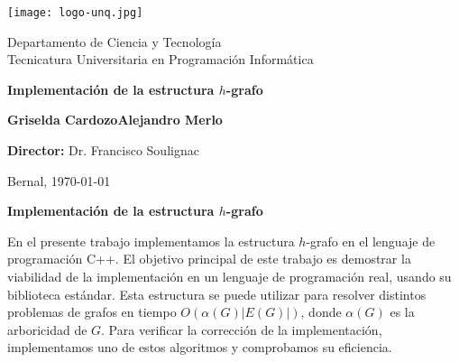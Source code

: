 \documentclass[%
    a4paper,%
    fontsize=12pt,%
    DIV=12,
    twoside,%
    openright,%
    titlepage=true,%
    headsepline,%
    toc=bibliography,%
    parskip=half,%
    cleardoublepage=empty,%
    headings=big,%
]{scrbook}
\DeclareRobustCommand{\CPP}{C\nolinebreak[4]\hspace{-.05em}\raisebox{.4ex}{\relsize{-3}\textbf{++}}\xspace}
\def\CPP{C++}%
\begin{document}

\frontmatter
\begin{titlepage}


\begin{center}
\texttt{[image: logo-unq.jpg]}\\

\medskip

Departamento de Ciencia y Tecnología\\
Tecnicatura Universitaria en Programación Informática\\

\vspace{3cm}

\textbf{\huge Implementación de la estructura $h$-grafo}\\[0.4cm] 

\vspace{1.5cm}

{\large \bfseries {}Griselda CardozoAlejandro Merlo}

\end{center}

\vspace{3cm}

\textbf{Director:} Dr. Francisco Soulignac

\vspace{5mm}

Bernal, \today
{}
\end{titlepage}


\newpage


\cleardoublepage

\vspace*{2cm}

\begin{center}
\Large \textbf{Implementación de la estructura $h$-grafo}
\end{center}


En el presente trabajo implementamos la estructura $h$-grafo en el lenguaje de programación \CPP.  El objetivo principal de este trabajo es demostrar la viabilidad de la implementación en un lenguaje de programación real, usando su biblioteca estándar. Esta estructura se puede utilizar para resolver distintos problemas de grafos en tiempo $O(\alpha(G)|E(G)|)$, donde $\alpha(G)$ es la arboricidad de $G$.  Para verificar la corrección de la implementación, implementamos uno de estos algoritmos y comprobamos su eficiencia.
\end{document}
